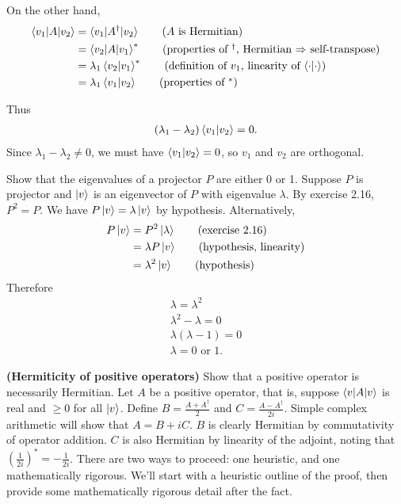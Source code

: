 On the other hand,
\begin{align*}
	\braket{v_1 | A | v_2} &= \braket{v_1 | A^\dagger | v_2} \tag{$A$ is Hermitian}\\ 
	&= \braket{v_2 | A | v_1}^* \tag{properties of $^\dagger$, Hermitian $\Rightarrow$ self-transpose} \\
	&= \lambda_1\braket{v_2 | v_1}^* \tag{definition of $v_1$, linearity of $\braket{\cdot |\cdot}$}\\
	&=  \lambda_1\braket{v_1 | v_2} \tag{properties of $^*$}
\end{align*}

Thus
\begin{align*}
	(\lambda_1 - \lambda_2) \braket{v_1 | v_2}  = 0.
\end{align*}
Since $\lambda_1 - \lambda_2 \neq 0$, we must have $\braket{v_1 | v_2}  = 0$, so $v_1$ and $v_2$ are orthogonal.


 Show that the eigenvalues of a projector $P$  are either 0 or 1.
\Soln Suppose $P$ is projector and $\ket{v}$ is an eigenvector of $P$ with eigenvalue $\lambda$.  By exercise 2.16, $P^2 = P$.  We have $P\ket{v} = \lambda \ket{v}$ by hypothesis.  Alternatively,
\begin{align*}
	P \ket{v} &= P^2 \ket{\lambda} \tag{exercise 2.16} \\
 	&= \lambda  P \ket{v} \tag{hypothesis, linearity} \\
	&= \lambda^2 \ket{v} \tag{hypothesis}
\end{align*}
Therefore
\begin{align*}
	\lambda = \lambda^2\\
	\lambda^2-\lambda = 0 \\
	\lambda (\lambda - 1) = 0\\
	\lambda = 0 \text{ or } 1.
\end{align*}


 \textbf{(Hermiticity of positive operators)} Show that a positive operator is necessarily Hermitian.
\Soln Let $A$ be a positive operator, that is, suppose $\braket{v | A | v}$ is real and $\geq 0$ for all $\ket{v}$.  Define $B =\frac{A + A^\dagger}{2}$ and $ C = \frac{A - A^\dagger}{2i}$.  Simple complex arithmetic will show that $A = B+iC$.  $B$ is clearly Hermitian by commutativity of operator addition. $C$ is also Hermitian by linearity of the adjoint, noting that $\left(\frac{1}{2i}\right)^* = -\frac{1}{2i}$.  There are two ways to proceed: one heuristic, and one mathematically rigorous.  We'll start with a heuristic outline of the proof, then provide some mathematically rigorous detail after the fact. 

